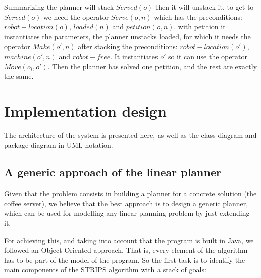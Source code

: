 \documentclass[12pt,a4paper,oneside]{article}
\numberwithin{equation}{section}
\numberwithin{equation}{section}
\theoremstyle{definition}
\begin{document}
 Summarizing the planner will stack $Served(o)$ then it will unstack it, to get to $Served(o)$ we need the operator $Serve(o,n)$ which has the preconditions: $robot-location(o)$, $ loaded(n) $ and $petition(o,n)$. with petition it instantiates the parameters, the planner unstacks loaded, for which it needs the operator $Make(o',n)$ after stacking the preconditions: $robot-location(o')$, $machine(o',n)$ and $robot-free$. It instantiates $o'$ so it can use the operator $Move(o_i,o')$. Then the planner has solved one petition, and the rest are exactly the same.

\section{Implementation design}

The architecture of the system is presented here, as well as the class diagram and package diagram in UML notation.

\subsection{A generic approach of the linear planner}
Given that the problem consists in building a planner for a concrete solution (the coffee server), we believe that the best approach is to design a generic planner, which can be used for modelling any linear planning problem by just extending it.

For achieving this, and taking into account that the program is built in Java, we followed an Object-Oriented approach. That is, every element of the algorithm has to be part of the model of the program. So the first task is to identify the main components of the STRIPS algorithm with a stack of goals:
\end{document}
